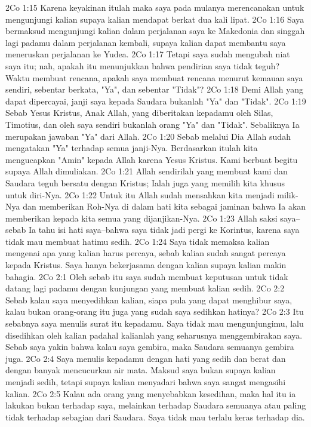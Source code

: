 2Co 1:15  Karena keyakinan itulah maka saya pada mulanya merencanakan untuk mengunjungi kalian supaya kalian mendapat berkat dua kali lipat.
2Co 1:16  Saya bermaksud mengunjungi kalian dalam perjalanan saya ke Makedonia dan singgah lagi padamu dalam perjalanan kembali, supaya kalian dapat membantu saya meneruskan perjalanan ke Yudea.
2Co 1:17  Tetapi saya sudah mengubah niat saya itu; nah, apakah itu menunjukkan bahwa pendirian saya tidak teguh? Waktu membuat rencana, apakah saya membuat rencana menurut kemauan saya sendiri, sebentar berkata, "Ya", dan sebentar "Tidak"?
2Co 1:18  Demi Allah yang dapat dipercayai, janji saya kepada Saudara bukanlah "Ya" dan "Tidak".
2Co 1:19  Sebab Yesus Kristus, Anak Allah, yang diberitakan kepadamu oleh Silas, Timotius, dan oleh saya sendiri bukanlah orang "Ya" dan "Tidak". Sebaliknya Ia merupakan jawaban "Ya" dari Allah.
2Co 1:20  Sebab melalui Dia Allah sudah mengatakan "Ya" terhadap semua janji-Nya. Berdasarkan itulah kita mengucapkan "Amin" kepada Allah karena Yesus Kristus. Kami berbuat begitu supaya Allah dimuliakan.
2Co 1:21  Allah sendirilah yang membuat kami dan Saudara teguh bersatu dengan Kristus; Ialah juga yang memilih kita khusus untuk diri-Nya.
2Co 1:22  Untuk itu Allah sudah mensahkan kita menjadi milik-Nya dan memberikan Roh-Nya di dalam hati kita sebagai jaminan bahwa Ia akan memberikan kepada kita semua yang dijanjikan-Nya.
2Co 1:23  Allah saksi saya--sebab Ia tahu isi hati saya--bahwa saya tidak jadi pergi ke Korintus, karena saya tidak mau membuat hatimu sedih.
2Co 1:24  Saya tidak memaksa kalian mengenai apa yang kalian harus percaya, sebab kalian sudah sangat percaya kepada Kristus. Saya hanya bekerjasama dengan kalian supaya kalian makin bahagia.
2Co 2:1  Oleh sebab itu saya sudah membuat keputusan untuk tidak datang lagi padamu dengan kunjungan yang membuat kalian sedih.
2Co 2:2  Sebab kalau saya menyedihkan kalian, siapa pula yang dapat menghibur saya, kalau bukan orang-orang itu juga yang sudah saya sedihkan hatinya?
2Co 2:3  Itu sebabnya saya menulis surat itu kepadamu. Saya tidak mau mengunjungimu, lalu disedihkan oleh kalian padahal kalianlah yang seharusnya menggembirakan saya. Sebab saya yakin bahwa kalau saya gembira, maka Saudara semuanya gembira juga.
2Co 2:4  Saya menulis kepadamu dengan hati yang sedih dan berat dan dengan banyak mencucurkan air mata. Maksud saya bukan supaya kalian menjadi sedih, tetapi supaya kalian menyadari bahwa saya sangat mengasihi kalian.
2Co 2:5  Kalau ada orang yang menyebabkan kesedihan, maka hal itu ia lakukan bukan terhadap saya, melainkan terhadap Saudara semuanya atau paling tidak terhadap sebagian dari Saudara. Saya tidak mau terlalu keras terhadap dia.
